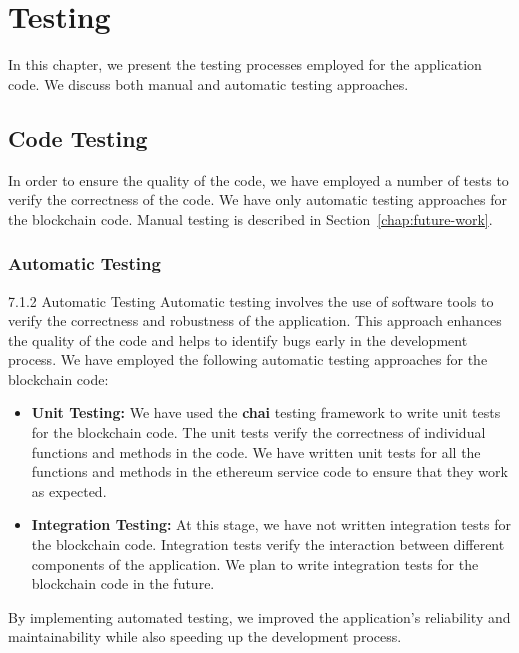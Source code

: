 %
%
%
\chapter{Testing}\label{chap:testing}

In this chapter, we present the testing processes employed for the application code. We
discuss both manual and automatic testing approaches.

\section{Code Testing}

In order to ensure the quality of the code, we have employed a number of tests to verify the correctness of the code. We have only automatic testing approaches for the blockchain code.
Manual testing is described in Section~\ref{chap:future-work}.

\subsection{Automatic Testing}

7.1.2 Automatic Testing
Automatic testing involves the use of software tools to verify the correctness and robustness of the application. This approach enhances the quality of the code and helps to identify bugs early in the development process. We have employed the following automatic testing approaches for the blockchain code:

\begin{itemize}
    \item \textbf{Unit Testing:} We have used the \textbf{chai} testing framework to write unit tests for the blockchain code. The unit tests verify the correctness of individual functions and methods in the code. We have written unit tests for all the functions and methods in the ethereum service code to ensure that they work as expected.

    \item \textbf{Integration Testing:} At this stage, we have not written integration tests for the blockchain code. Integration tests verify the interaction between different components of the application. We plan to write integration tests for the blockchain code in the future.

\end{itemize}

By implementing automated testing, we improved the application's reliability and maintainability while also speeding up the development process.




